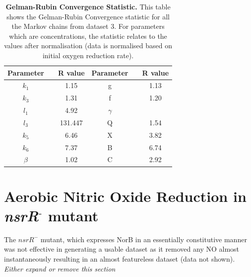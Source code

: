 \begin{table}[tbp]%
\renewcommand{\arraystretch}{1.5}
\begin{center}
\begin{tabular}{ccc|ccc}
\toprule
\textbf{Parameter} && \textbf{R value} & \textbf{Parameter} && \textbf{R value}\\
\midrule
$k_1$ && 1.15 & g && 1.13\\
$k_3$ && 1.31 & f && 1.20\\
$l_1$ && 4.92 & $\gamma$ && \\
$l_3$ && 131.447 & Q && 1.54\\
$k_5$ && 6.46 & X && 3.82\\
$k_6$ && 7.37 & B && 6.74\\
$\beta$ && 1.02 & C && 2.92 \\
\bottomrule
\end{tabular}
\end{center}
\caption[Gelman-Rubin Convergence Statistic]{{\bf Gelman-Rubin Convergence Statistic.} This table shows the Gelman-Rubin Convergence statistic for all the Markov chains from dataset 3. For parameters which are concentrations, the statistic relates to the values after normalisation (data is normalised based on initial oxygen reduction rate).
\label{tab:noRstat-redone}}
\end{table}

\section{\texorpdfstring{Aerobic Nitric Oxide Reduction in \textit{nsrR$^\textrm{-}$} mutant}{Aerobic Nitric Oxide Reduction in nsrR- mutant}}
 The $\mathit{nsrR}^-$ mutant, which expresses NorB in an essentially constitutive manner was not effective in generating a usable dataset as it removed any NO almost instantaneously resulting in an almost featureless dataset (data not shown). \textit{Either expand or remove this section}
